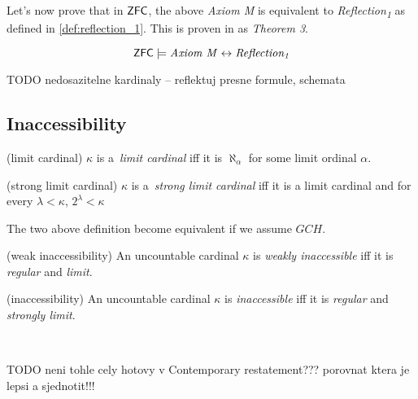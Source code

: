 Let's now prove that in $\sf{ZFC}$, the above \emph{Axiom M} is equivalent to \emph{Reflection\textsubscript{1}} as defined in \ref{def:reflection_1}. This is proven in \cite{Levy60a} as \emph{Theorem 3}. %
\begin{theorem}\label{theorem:levy_m_iff_reflection}
\begin{equation}
\sf{ZFC} \models \mbox{\emph{Axiom M}} \iff \mbox{\emph{Reflection\textsubscript{1}}}
\end{equation}
\end{theorem}

TODO nedosazitelne kardinaly -- reflektuj presne formule, schemata

\subsection{Inaccessibility}\label{section:inaccessibility}
\begin{definition}{(limit cardinal)}\label{def:limit}
$\kappa$ is a~\emph{limit cardinal} iff it is $\aleph_\alpha$ for some limit ordinal $\alpha$.
\end{definition}

\begin{definition}{(strong limit cardinal)}\label{def:strong_limit}
$\kappa$ is a~\emph{strong limit cardinal} iff it is a limit cardinal and for every $\lambda < \kappa$, $2^\lambda < \kappa$
\end{definition}

The two above definition become equivalent if we assume $GCH$.

\begin{definition}{(weak inaccessibility)}\label{def:weakly_inaccessible}
An uncountable cardinal $\kappa$ is \emph{weakly inaccessible} iff it is \emph{regular} and \emph{limit}.
\end{definition}
\begin{definition}(inaccessibility)\label{def:inaccessible}
An uncountable cardinal $\kappa$ is \emph{inaccessible} iff it is \emph{regular} and \emph{strongly limit}.
\end{definition}

\

TODO neni tohle cely hotovy v Contemporary restatement??? porovnat ktera je lepsi a sjednotit!!!

